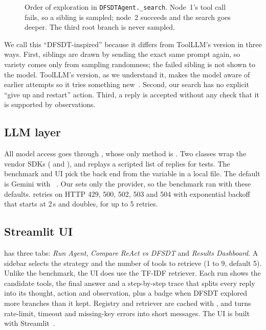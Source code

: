 \documentclass[conference,a4paper]{IEEEtran}
\begin{document}
\begin{figure}[t]
  \centering
  
  \caption{Order of exploration in \texttt{DFSDTAgent.\_search}. Node~1's
  tool call fails, so a sibling is sampled; node~2 succeeds and the
  search goes deeper. The third root branch is never sampled.}
  \label{fig:tree}
\end{figure}

We call this ``DFSDT-inspired'' because it differs from ToolLLM's version
in three ways. First, siblings are drawn by sending the exact same prompt
again, so variety comes only from sampling randomness; the failed sibling
is not shown to the model. ToolLLM's version, as we understand it, makes
the model aware of earlier attempts so it tries something new~\cite{qin2024toolllm}.
Second, our search has no explicit ``give up and restart'' action. Third,
a  reply is accepted without any check that it is supported
by observations.

\subsection{LLM layer}
All model access goes through , whose only method is
. Two classes wrap the vendor SDKs
( and ), and  replays a scripted list of replies for tests. The benchmark
and UI pick the back end from the  variable in a
local  file. The default is Gemini with
~\cite{gemini}. Our  sets only the
provider, so the benchmark ran with these defaults.  retries on HTTP 429, 500, 502, 503 and
504 with exponential backoff that starts at 2\,s and doubles, for up to 5
retries.

\subsection{Streamlit UI}
 has three tabs: \emph{Run Agent}, \emph{Compare ReAct vs
DFSDT} and \emph{Results Dashboard}. A sidebar selects the strategy and the
number of tools to retrieve (1 to 9, default 5). Unlike the benchmark, the
UI does use the TF-IDF retriever. Each run shows the candidate tools, the
final answer and a step-by-step trace that splits every reply into its
thought, action and observation, plus a badge when DFSDT explored more
branches than it kept. Registry and retriever are cached with
, and  turns rate-limit,
timeout and missing-key errors into short messages. The UI is built with
Streamlit~\cite{streamlit}.
\end{document}
